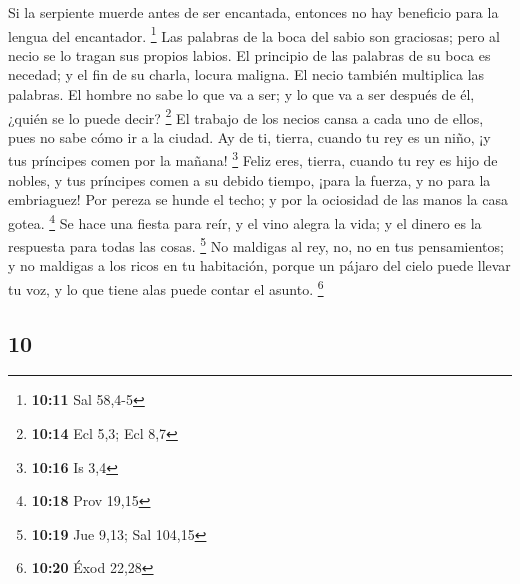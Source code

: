 \begin{paracol}{2}
 Si la serpiente muerde antes de ser encantada, entonces
no hay beneficio para la lengua del encantador. \footnote{\textbf{10:11}
  Sal 58,4-5}  Las palabras de la boca del sabio son
graciosas; pero al necio se lo tragan sus propios labios.
 El principio de las palabras de su boca es necedad; y el
fin de su charla, locura maligna.  El necio también
multiplica las palabras. El hombre no sabe lo que va a ser; y lo que va
a ser después de él, ¿quién se lo puede decir? \footnote{\textbf{10:14}
  Ecl 5,3; Ecl 8,7}  El trabajo de los necios cansa a
cada uno de ellos, pues no sabe cómo ir a la ciudad.  Ay
de ti, tierra, cuando tu rey es un niño, ¡y tus príncipes comen por la
mañana! \footnote{\textbf{10:16} Is 3,4}  Feliz eres,
tierra, cuando tu rey es hijo de nobles, y tus príncipes comen a su
debido tiempo, ¡para la fuerza, y no para la embriaguez! 
Por pereza se hunde el techo; y por la ociosidad de las manos la casa
gotea. \footnote{\textbf{10:18} Prov 19,15}  Se hace una
fiesta para reír, y el vino alegra la vida; y el dinero es la respuesta
para todas las cosas. \footnote{\textbf{10:19} Jue 9,13; Sal 104,15}
 No maldigas al rey, no, no en tus pensamientos; y no
maldigas a los ricos en tu habitación, porque un pájaro del cielo puede
llevar tu voz, y lo que tiene alas puede contar el asunto. \footnote{\textbf{10:20}
  Éxod 22,28}

\switchcolumn
\begin{otherlanguage}{english}

\hypertarget{section-19}{%
\section{10}\label{section-19}}


\end{otherlanguage}
\end{paracol}

